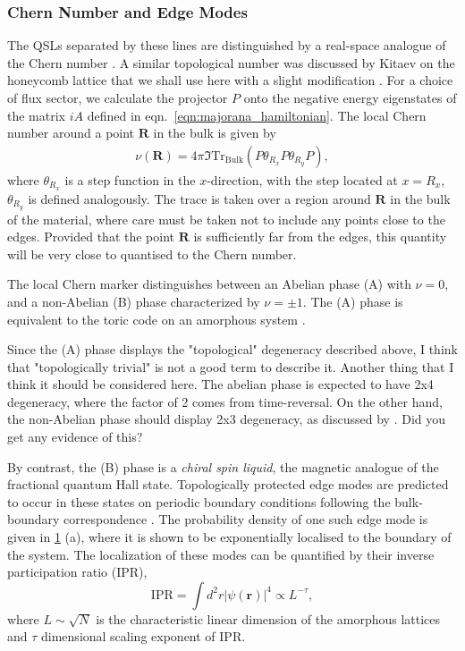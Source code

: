 \hypertarget{chern-number-and-edge-modes}{%
\subsubsection{Chern Number and Edge
Modes}\label{chern-number-and-edge-modes}}

The QSLs separated by these lines are distinguished by a real-space
analogue of the Chern number
\autocite{bianco_mapping_2011,Hastings_Almost_2010}. A similar
topological number was discussed by Kitaev on the honeycomb lattice
\autocite{kitaevAnyonsExactlySolved2006} that we shall use here with a
slight modification
\autocite{peru_preprint,mitchellAmorphousTopologicalInsulators2018}. For
a choice of flux sector, we calculate the projector \(P\) onto the
negative energy eigenstates of the matrix \(iA\) defined in
eqn.~\protect\hyperlink{eqn:majorana_hamiltonian}{{[}eqn:majorana\_hamiltonian{]}}.
The local Chern number around a point \(\textbf{R}\) in the bulk is
given by \[\begin{aligned}
    \nu (\textbf{R}) = 4\pi \Im \mathrm{Tr}_{\mathrm{Bulk}} 
    \left ( 
    P\theta_{R_x} P \theta_{R_y} P
    \right ),\end{aligned}\] where \(\theta_{R_x}\) is a step function
in the \(x\)-direction, with the step located at \(x = R_x\),
\(\theta_{R_y}\) is defined analogously. The trace is taken over a
region around \(\textbf{R}\) in the bulk of the material, where care
must be taken not to include any points close to the edges. Provided
that the point \(\textbf{R}\) is sufficiently far from the edges, this
quantity will be very close to quantised to the Chern number.

The local Chern marker distinguishes between an Abelian phase (A) with
\(\nu = 0\), and a non-Abelian (B) phase characterized by
\(\nu = \pm 1\). The (A) phase is equivalent to the toric code on an
amorphous system \autocite{kitaev_fault-tolerant_2003}.

Since the (A) phase displays the "topological" degeneracy described
above, I think that "topologically trivial" is not a good term to
describe it. Another thing that I think it should be considered here.
The abelian phase is expected to have 2x4 degeneracy, where the factor
of 2 comes from time-reversal. On the other hand, the non-Abelian phase
should display 2x3 degeneracy, as discussed by
\autocite{yaoExactChiralSpin2007}. Did you get any evidence of this?

By contrast, the (B) phase is a \emph{chiral spin liquid}, the magnetic
analogue of the fractional quantum Hall state. Topologically protected
edge modes are predicted to occur in these states on periodic boundary
conditions following the bulk-boundary correspondence
\autocite{qi_general_2006}. The probability density of one such edge
mode is given in \protect\hyperlink{fig:edge_modes}{1} (a), where it is
shown to be exponentially localised to the boundary of the system. The
localization of these modes can be quantified by their inverse
participation ratio (IPR),
\[\mathrm{IPR} = \int d^2r|\psi(\mathbf{r})|^4  \propto L^{-\tau},\]
where \(L\sim\sqrt{N}\) is the characteristic linear dimension of the
amorphous lattices and \(\tau\) dimensional scaling exponent of IPR.

